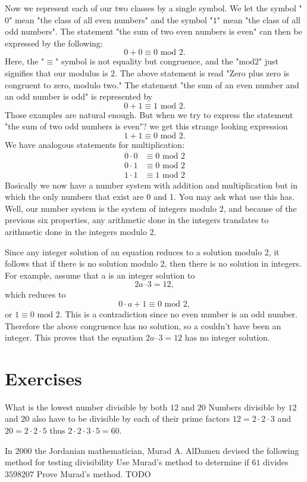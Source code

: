 Now we represent each of our two classes by a single symbol. We let the symbol "$0$" mean "the class of all even numbers" and the symbol "$1$" mean "the class of all odd numbers". The statement "the sum of two even numbers is even" can then be expressed by the following:
\[
0 + 0 \equiv 0 \textrm{ mod } 2.
\]
Here, the "$\equiv$" symbol is not equality but congruence, and the "$\textrm{mod} 2$" just signifies that our modulus is $2$. The above statement is read "Zero plus zero is congruent to zero, modulo two." The statement "the sum of an even number and an odd number is odd" is represented by
\[
0 + 1 \equiv 1 \textrm{ mod } 2.
\]
Those examples are natural enough. But when we try to express the statement "the sum of two odd numbers is even"? we get this strange looking expression
\[
1 + 1 \equiv 0 \textrm{ mod } 2.
\]
We have analogous statements for multiplication:
\begin{align*}
0 \cdot 0 &\equiv 0 \textrm{ mod } 2 \\
0 \cdot 1 &\equiv 0 \textrm{ mod } 2 \\
1 \cdot 1 &\equiv 1 \textrm{ mod } 2
\end{align*}
Basically we now have a number system with addition and multiplication but in which the only numbers that exist are 0 and 1. You may ask what use this has. Well, our number system is the system of integers modulo 2, and because of the previous six properties, any arithmetic done in the integers translates to arithmetic done in the integers modulo 2.

Since any integer solution of an equation reduces to a solution modulo 2, it follows that if there is no solution modulo 2, then there is no solution in integers. For example, assume that a is an integer solution to
\[
2a – 3 = 12,
\]
which reduces to
\[
0 \cdot a + 1 \equiv 0 \textrm{ mod } 2,
\]
or $1 \equiv 0 \textrm{ mod } 2$. This is a contradiction since no even number is an odd number. Therefore the above congruence has no solution, so a couldn't have been an integer. This proves that the equation $2a – 3 = 12$ has no integer solution.

\section{Exercises}
\begin{ExerciseList}
\Exercise What is the lowest number divisible by both $12$ and $20$
\Answer Numbers divisible by $12$ and $20$ also have to be divisible by each of
their prime factors $12 = 2 \cdot 2 \cdot 3$ and $20 = 2 \cdot 2 \cdot 5$ thus
$2 \cdot 2 \cdot 3 \cdot 5 = 60$.

\Exercise In 2000 the Jordanian mathematician, Murad A. AlDamen devised the following method for testing divisibility 
\Question Use Murad's method to determine if $61$ divides $3598207$
\Question Prove Murad's method.
\Answer TODO
\end{ExerciseList}

